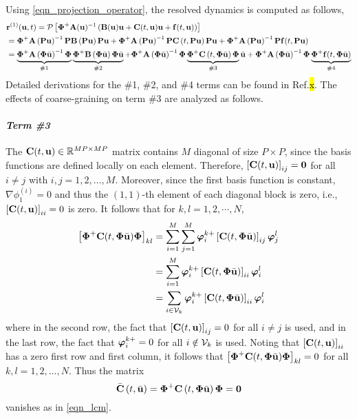 Using \cref{eqn_projection_operator}, the resolved dynamics is computed as follows,
\begin{subequations}
    \begin{align}
        &\mathbf{r}^{(1)}(\mathbf{u},t) = \mathcal{P}\left[\boldsymbol{\Phi}^{+}\mathbf{A}(\mathbf{u})^{-1}\left(\mathbf{B}(\mathbf{u})\mathbf{u} + \mathbf{C}(t,\mathbf{u})\mathbf{u} + \mathbf{f}(t,\mathbf{u})\right)\right]\\
        &= \boldsymbol{\Phi}^{+}\mathbf{A}\left(\mathbf{P}\mathbf{u}\right)^{-1}\mathbf{P}\mathbf{B}\left(\mathbf{P}\mathbf{u}\right)\mathbf{P}\mathbf{u} + \boldsymbol{\Phi}^{+}\mathbf{A}\left(\mathbf{P}\mathbf{u}\right)^{-1}\mathbf{P}\mathbf{C}\left(t,\mathbf{P}\mathbf{u}\right)\mathbf{P}\mathbf{u} + \boldsymbol{\Phi}^{+}\mathbf{A}\left(\mathbf{P}\mathbf{u}\right)^{-1}\mathbf{P}\mathbf{f}(t,\mathbf{P}\mathbf{u})\\
        &= \underbrace{\boldsymbol{\Phi}^{+}\mathbf{A}\left(\boldsymbol{\Phi}\bar{\mathbf{u}}\right)^{-1}\boldsymbol{\Phi}}_{\text{\#1}}\underbrace{\boldsymbol{\Phi}^{+}\mathbf{B}\left(\boldsymbol{\Phi}\bar{\mathbf{u}}\right)\boldsymbol{\Phi}\bar{\mathbf{u}}}_{\text{\#2}} + \boldsymbol{\Phi}^{+}\mathbf{A}\left(\boldsymbol{\Phi}\bar{\mathbf{u}}\right)^{-1}\boldsymbol{\Phi}\underbrace{\boldsymbol{\Phi}^{+}\mathbf{C}\left(t,\boldsymbol{\Phi}\bar{\mathbf{u}}\right)\boldsymbol{\Phi}}_{\text{\#3}}\bar{\mathbf{u}} + \boldsymbol{\Phi}^{+}\mathbf{A}\left(\boldsymbol{\Phi}\bar{\mathbf{u}}\right)^{-1}\boldsymbol{\Phi}\underbrace{\boldsymbol{\Phi}^{+}\mathbf{f}(t,\boldsymbol{\Phi}\bar{\mathbf{u}})}_{\text{\#4}}
    \end{align}
\end{subequations}
Detailed derivations for the \#1, \#2, and \#4 terms can be found in Ref.\hl{x}. The effects of coarse-graining on term \#3 are analyzed as follows.

\paragraph*{\textit{Term \#3}} The $\mathbf{C}(t,\mathbf{u})\in\mathbb{R}^{MP\times MP}$ matrix contains $M$ diagonal of size $P\times P$, since the basis functions are defined locally on each element. Therefore, $\left[\mathbf{C}(t,\mathbf{u})\right]_{ij} = \boldsymbol{0}$ for all $i \neq j$ with $i,j=1,2,\dots,M$. Moreover, since the first basis function is constant, $\nabla\phi_1^{(i)} = 0$ and thus the $(1,1)$-th element of each diagonal block is zero, i.e., $\left[\mathbf{C}(t,\mathbf{u})\right]_{ii}=0$ is zero. It follows that for $k,l=1,2,\cdots,N$,
\begin{subequations}
    \begin{align}
        \left[\boldsymbol{\Phi}^{+}\mathbf{C}(t,\boldsymbol{\Phi}\bar{\mathbf{u}})\boldsymbol{\Phi}\right]_{kl} &= \sum_{i=1}^{M}\sum_{j=1}^{M}\boldsymbol{\varphi}_{i}^{k+}\left[\mathbf{C}(t,\boldsymbol{\Phi}\bar{\mathbf{u}})\right]_{ij}\boldsymbol{\varphi}_{j}^{l}\\
        &= \sum_{i=1}^{M}\boldsymbol{\varphi}_{i}^{k+}\left[\mathbf{C}(t,\boldsymbol{\Phi}\bar{\mathbf{u}})\right]_{ii}\boldsymbol{\varphi}_{i}^{l}\\
        &= \sum_{i\in\mathcal{V}_k} \boldsymbol{\varphi}_{i}^{k+}\left[\mathbf{C}(t,\boldsymbol{\Phi}\bar{\mathbf{u}})\right]_{ii}\boldsymbol{\varphi}_{i}^{l}
    \end{align}
\end{subequations}
where in the second row, the fact that $\left[\mathbf{C}(t,\mathbf{u})\right]_{ij} = 0$ for all $i\neq j$ is used, and in the last row, the fact that $\boldsymbol{\varphi}_{i}^{k+}=0$ for all $i\notin\mathcal{V}_k$ is used. Noting that $\left[\mathbf{C}(t,\mathbf{u})\right]_{ii}$ has a zero first row and first column, it follows that $\left[\boldsymbol{\Phi}^{+}\mathbf{C}(t,\boldsymbol{\Phi}\bar{\mathbf{u}})\boldsymbol{\Phi}\right]_{kl} = 0$ for all $k,l=1,2,\dots,N$. Thus the matrix
\begin{equation}
    \bar{\mathbf{C}}\left(t,\bar{\mathbf{u}}\right) = \boldsymbol{\Phi}^{+}\mathbf{C}\left(t,\boldsymbol{\Phi}\bar{\mathbf{u}}\right)\boldsymbol{\Phi} = \boldsymbol{0}
\end{equation}
vanishes as in \cref{eqn_lcm}.

